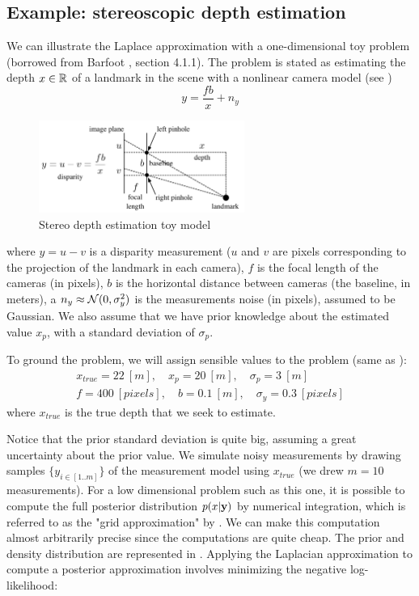 \subsection{Example: stereoscopic depth estimation}

 We can illustrate the Laplace approximation with a one-dimensional toy problem (borrowed from Barfoot \cite{barfoot2017state}, section 4.1.1).
The problem is stated as estimating the depth $x \in \mathbb{R}$ of a landmark in the scene with a nonlinear camera model (see )
%
\begin{equation}
    y = \frac{fb}{x} + n_y
\end{equation}
%
%
\begin{figure}[h]
    \centering
    \includegraphics[width=0.6\textwidth]{figures/barfoot_stereo.png}
    \caption{Stereo depth estimation toy model \cite{barfoot2017state}}
    \label{fig:barfoot_stereo}
 \end{figure}
%
where $y=u - v$ is a disparity measurement ($u$ and $v$ are pixels corresponding to the projection of the landmark in each camera), $f$ is the focal
length of the cameras (in pixels), $b$ is the horizontal distance between cameras (the baseline, in meters), a $n_y \approx \mathcal{N}({0},{\sigma_y^2})$ 
is the measurements noise (in pixels), assumed to be Gaussian. We also assume that we have prior knowledge about the 
estimated value $x_p$, with a standard deviation of $\sigma_p$.

To ground the problem, we will assign sensible values to the problem (same as \cite{barfoot2017state}):
%
\begin{gather*}
    x_{true} = 22~[m], \quad x_p = 20~[m], \quad \sigma_p = 3~[m] \\
    f = 400~[pixels], \quad b = 0.1~[m], \quad \sigma_y = 0.3~[pixels]   
\end{gather*}
%
where $x_{true}$ is the true depth that we seek to estimate.

Notice that the prior standard deviation is quite big, assuming a great uncertainty about the prior value. We simulate noisy measurements by drawing samples 
$\{y_{i \in [1..m]}\}$ of the measurement model using $x_{true}$ (we drew $m=10$ measurements). For a low dimensional problem such as this one, 
it is possible to compute the full posterior distribution $p(x|{\bf y})$ by numerical integration, which is referred to as the "grid approximation" by 
\cite{mcelreath2018statistical}. We can make this computation almost arbitrarily precise since the computations are quite cheap. The prior and density distribution are represented in . Applying the Laplacian approximation to
compute a posterior approximation involves minimizing the negative log-likelihood:

